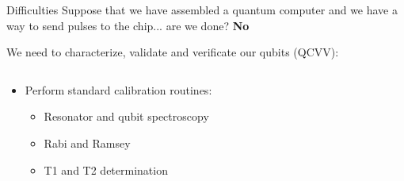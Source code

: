 \documentclass[11p,aspectratio=169]{beamer}
\begin{document}
\begin{frame}{Difficulties}
    Suppose that we have assembled a quantum computer and we have a way
    to send pulses to the chip... are we done? {\color{red} \textbf{No} }

    We need to { \color{blue} characterize}, { \color{blue} validate} and { \color{blue} verificate} our qubits (QCVV):
    \begin{columns}
        \begin{column}{0.5 \textwidth}
            \vspace{-2cm}
            \begin{itemize}
                \item[\faCaretSquareORight] Perform standard calibration routines:
                \begin{itemize}
                    \item[\faWrench] Resonator and qubit spectroscopy
                    \item[\faWrench] Rabi and Ramsey 
                    \item[\faWrench] T1 and T2 determination
                

\end{itemize}
\end{itemize}
\end{column}
\end{columns}
\end{frame}
\end{document}

